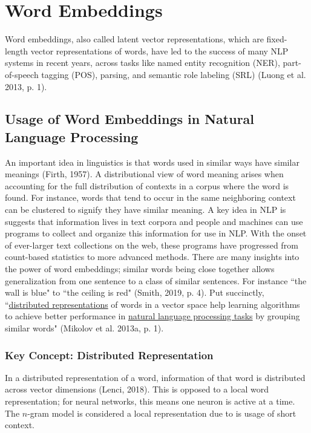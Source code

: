 \section{Word Embeddings} \label{sec:WordEmbeddings}

Word embeddings, also called latent vector representations, which are fixed-length vector representations of words, have led to the success of many NLP systems in recent years, across tasks like named entity recognition (NER), part-of-speech tagging (POS), parsing, and semantic role labeling (SRL) (Luong et al. 2013, p. 1).

\subsection{Usage of Word Embeddings in Natural Language Processing} \label{sec:WordEmb_Useage}

An important idea in linguistics is that words used in similar ways have similar meanings (Firth, 1957). A distributional view of word meaning arises when accounting for the full distribution of contexts in a corpus where the word is found. For instance, words that tend to occur in the same neighboring context can be clustered to signify they have similar meaning. A key idea in NLP is suggests that information lives in text corpora and people and machines can use programs to collect and organize this information for use in NLP. With the onset of ever-larger text collections on the web, these programs have progressed from count-based statistics to more advanced methods. There are many insights into the power of word embeddings; similar words being close together allows generalization from one sentence to a class of similar sentences. For instance ``the wall is blue" to ``the ceiling is red" (Smith, 2019, p. 4). Put succinctly, ``\hyperref[sec:DistributedRepr]{distributed representations} of words in a vector space help learning algorithms to achieve better performance in \hyperref[app:Appendix_NLPTasks]{natural language processing tasks} by grouping similar words" (Mikolov et al. 2013a, p. 1). 

\subsubsection{Key Concept: Distributed Representation} \label{sec:DistributedRepr}

In a distributed representation of a word, information of that word is distributed across vector dimensions (Lenci, 2018). This is opposed to a local word representation; for neural networks, this means one neuron is active at a time. The $n$-gram model is considered a local representation due to is usage of short context. 

